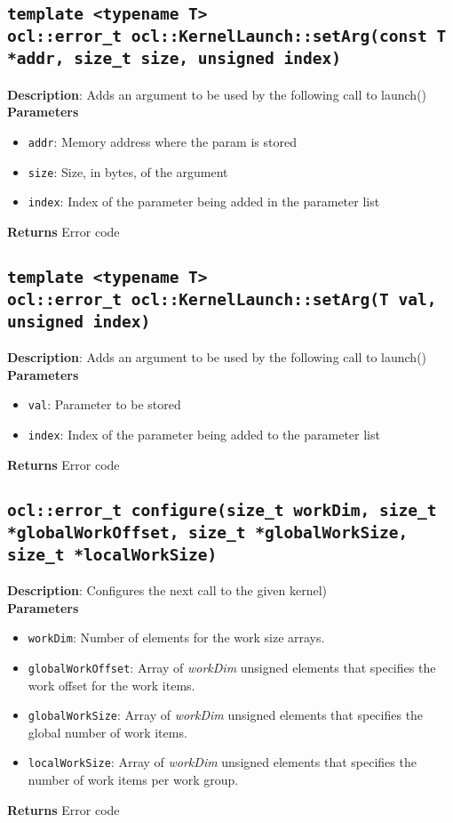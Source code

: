 \subsection{\texttt{template <typename T>\\ocl::error\_t ocl::KernelLaunch::setArg(const T *addr, size\_t size, unsigned index)}}

\textbf{Description}: Adds an argument to be used by the following call to launch()\\
\textbf{Parameters}
\begin{itemize}
  \item \texttt{addr}: Memory address where the param is stored
  \item \texttt{size}: Size, in bytes, of the argument
  \item \texttt{index}: Index of the parameter being added in the parameter list
\end{itemize}
\textbf{Returns} Error code


\subsection{\texttt{template <typename T>\\ocl::error\_t ocl::KernelLaunch::setArg(T val, unsigned index)}}

\textbf{Description}: Adds an argument to be used by the following call to launch()\\
\textbf{Parameters}
\begin{itemize}
  \item \texttt{val}: Parameter to be stored
  \item \texttt{index}: Index of the parameter being added to the parameter list
\end{itemize}
\textbf{Returns} Error code

\subsection{\texttt{ocl::error\_t configure(size\_t workDim, size\_t *globalWorkOffset, size\_t *globalWorkSize, size\_t *localWorkSize)}}

\textbf{Description}: Configures the next call to the given kernel) \\
\textbf{Parameters}
\begin{itemize}
  \item \texttt{workDim}: Number of elements for the work size arrays.
  \item \texttt{globalWorkOffset}: Array of \emph{workDim} unsigned elements that specifies the work 
    offset for the work items.
  \item \texttt{globalWorkSize}: Array of \emph{workDim} unsigned elements that specifies the global 
    number of work items.
  \item \texttt{localWorkSize}: Array of \emph{workDim} unsigned elements that specifies the number 
    of work items per work group.
\end{itemize}
\textbf{Returns} Error code

